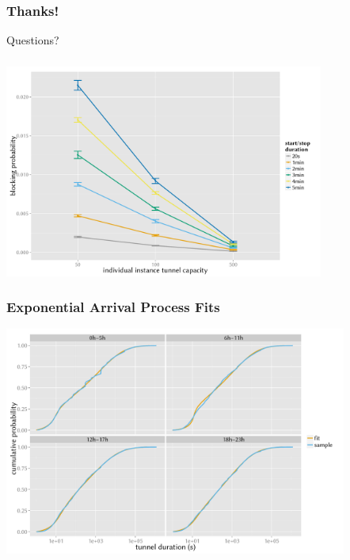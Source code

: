 \documentclass{beamer}
\begin{document}
\section*{}
\begin{frame}
	\frametitle{Thanks!}

	\centering
		\Large Questions?
\end{frame}

\appendix
{}
\setcounter{finalframe}{\value{framenumber}}

\begin{frame}
\end{frame}




\begin{frame}
	\frametitle{}
	\begin{center}
		\includegraphics[height=7cm]{../../chapters/04-mobilenets/images/compare-maxinstances-block.pdf}
	\end{center}
\end{frame}


\begin{frame}
	\frametitle{Exponential Arrival Process Fits}

	\begin{center}
		\includegraphics[height=7.5cm]{../../chapters/04-mobilenets/images/R-duration-fit-cdf-facets.pdf}
	\end{center}
\end{frame}
\end{document}

